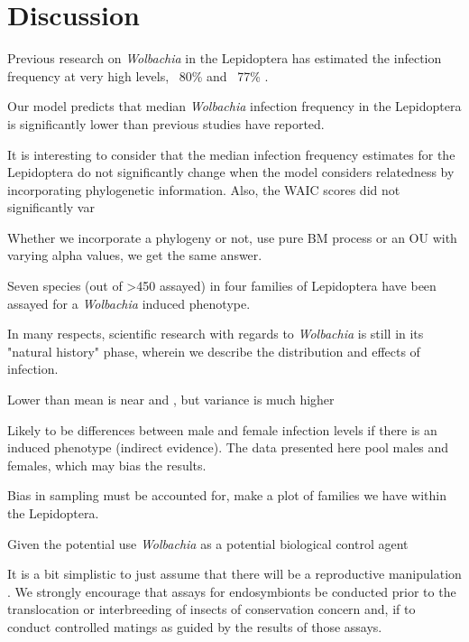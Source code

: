 \documentclass{frontiersSCNS}
\begin{document}
\section{Discussion}

Previous research on \textit{Wolbachia} in the Lepidoptera has estimated the infection frequency at very high levels, ~80\% \citet{Ahmed:2015aa} and ~77\% \citet{Weinert:2015aa}. 

Our model predicts that median \textit{Wolbachia} infection frequency in the Lepidoptera is significantly lower than previous studies have reported. 

It is interesting to consider that the median infection frequency estimates for the Lepidoptera do not significantly change when the model considers relatedness by incorporating phylogenetic information. Also, the WAIC scores did not significantly var

Whether we incorporate a phylogeny or not, use pure BM process or an OU with varying alpha values, we get the same answer. 



Seven species (out of >450 assayed) in four families of Lepidoptera have been assayed for a \textit{Wolbachia} induced phenotype. 

In many respects, scientific research with regards to \textit{Wolbachia} is still in its "natural history" phase, wherein we describe the distribution and effects of infection.  

Lower than \citet{Hilgenboecker:2008aa}
mean is near \citet{Ahmed:2015aa} and \citet{Weinert:2015aa}, but variance is much higher

Likely to be differences between male and female infection levels if there is an induced phenotype (indirect evidence). The data presented here pool males and females, which may bias the results.

Bias in sampling must be accounted for, make a plot of families we have within the Lepidoptera.

Given the potential use \textit{Wolbachia} as a potential biological control agent



It is a bit simplistic to just assume that there will be a reproductive manipulation \citep{Nice:2009p7399,Hamm:2014wi}. We strongly encourage that assays for endosymbionts be conducted prior to the translocation or interbreeding of insects of conservation concern and, if to conduct controlled matings as guided by the results of those assays. 
\end{document}
